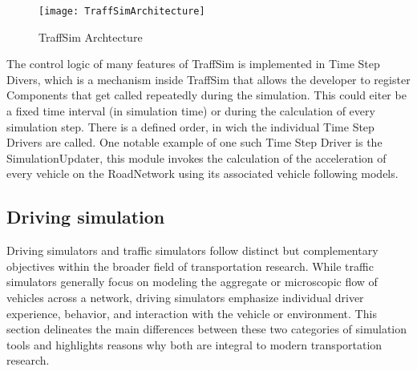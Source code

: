             \begin{figure}[H]
                \centering
                \texttt{[image: TraffSimArchitecture]}
                \caption{TraffSim Archtecture\cite{TraffSimDoku}}
                \label{fig:traffSim-architecture}
            \end{figure}

            The control logic of many features of TraffSim is implemented in Time Step Divers, which is a mechanism inside TraffSim that allows the developer to register Components that get called repeatedly during the simulation.
            This could eiter be a fixed time interval (in simulation time) or during the calculation of every simulation step.
            There is a defined order, in wich the individual Time Step Drivers are called.
            One notable example of one such Time Step Driver is the SimulationUpdater, this module invokes the calculation of the acceleration of every vehicle on the RoadNetwork using its associated vehicle following models.

        \subsection{Driving simulation}\label{subsec:driving-simulation2}
            Driving simulators and traffic simulators follow distinct but complementary objectives within the broader field of transportation research.
            While traffic simulators generally focus on modeling the aggregate or microscopic flow of vehicles across a network, driving simulators emphasize individual driver experience, behavior, and interaction with the vehicle or environment.
            This section delineates the main differences between these two categories of simulation tools and highlights reasons why both are integral to modern transportation research.

